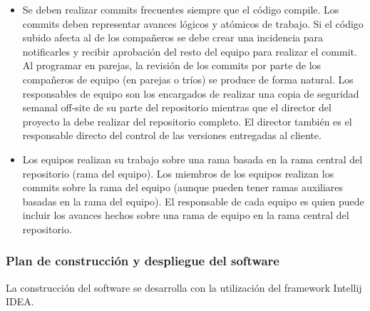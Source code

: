 \begin{itemize}
\item{Se deben realizar commits frecuentes siempre que el código compile. Los commits deben representar avances lógicos y atómicos de trabajo.  Si el código subido afecta al de los compañeros se debe crear una incidencia para notificarles  y recibir aprobación del resto del equipo para realizar el commit. Al programar en parejas, la revisión de los commits por parte de los compañeros de equipo (en parejas o tríos) se produce de forma natural. Los responsables de equipo son los encargados de realizar una copia de seguridad semanal off-site de su parte del repositorio mientras que el director del proyecto la debe realizar del repositorio completo. El director también es el responsable directo del control de las versiones entregadas al cliente. }
		\item Los equipos realizan su trabajo sobre una rama basada en la rama central del repositorio (rama del equipo). Los miembros de los equipos realizan los commits sobre la rama del equipo (aunque pueden tener ramas auxiliares basadas en la rama del equipo). El responsable de cada equipo es quien puede incluir los avances hechos sobre una rama de equipo en la rama central del repositorio.
\end{itemize}

\subsubsection{Plan de construcción y despliegue del software}

La construcción del software se desarrolla con la utilización del framework Intellij IDEA.\\

